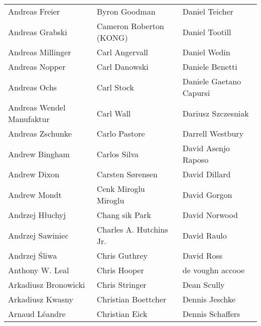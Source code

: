 \begin{tabular}{p{4.5cm}p{4.5cm}p{4.5cm}}
Andreas Freier & Byron Goodman & Daniel Teicher \\
Andreas Grabski & Cameron Roberton (KONG) & Daniel Tootill \\
Andreas Millinger & Carl Angervall & Daniel Wedin \\
Andreas Nopper & Carl Danowski & Daniele Benetti \\
Andreas Ochs & Carl Stock & Daniele Gaetano Capursi \\
Andreas Wendel Manufaktur & Carl Wall & Dariusz Szczesniak \\
Andreas Zschunke & Carlo Pastore & Darrell Westbury \\
Andrew Bingham & Carlos Silva & David Asenjo Raposo \\
Andrew Dixon & Carsten Sørensen & David Dillard \\
Andrew Mondt & Cenk Miroglu Miroglu & David Gorgon \\
Andrzej Hłuchyj & Chang sik Park & David Norwood \\
Andrzej Sawiniec & Charles A. Hutchins Jr. & David Raulo \\
Andrzej Śliwa & Chris Guthrey & David Ross \\
Anthony W. Leal & Chris Hooper & de voughn accooe \\
Arkadiusz Bronowicki & Chris Stringer & Dean Scully \\
Arkadiusz Kwasny & Christian Boettcher & Dennis Jeschke \\
Arnaud Léandre & Christian Eick & Dennis Schaffers \\
\end{tabular}
\newpage
\setlength{\tabcolsep}{1mm}
